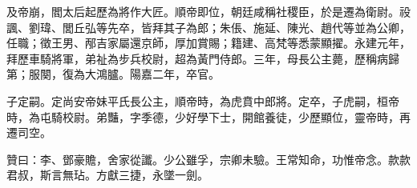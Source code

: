 \begin{pinyinscope}
及帝崩，閻太后起歷為將作大匠。順帝即位，朝廷咸稱社稷臣，於是遷為衛尉。祋諷、劉瑋、閭丘弘等先卒，皆拜其子為郎；朱倀、施延、陳光、趙代等並為公卿，任職；徵王男、邴吉家屬還京師，厚加賞賜；籍建、高梵等悉蒙顯擢。永建元年，拜歷車騎將軍，弟祉為步兵校尉，超為黃門侍郎。三年，母長公主薨，歷稱病歸第；服闋，復為大鴻臚。陽嘉二年，卒官。

子定嗣。定尚安帝妹平氏長公主，順帝時，為虎賁中郎將。定卒，子虎嗣，桓帝時，為屯騎校尉。弟豔，字季德，少好學下士，開館養徒，少歷顯位，靈帝時，再遷司空。

贊曰：李、鄧豪贍，舍家從讖。少公雖孚，宗卿未驗。王常知命，功惟帝念。款款君叔，斯言無玷。方獻三捷，永墜一劍。


\end{pinyinscope}